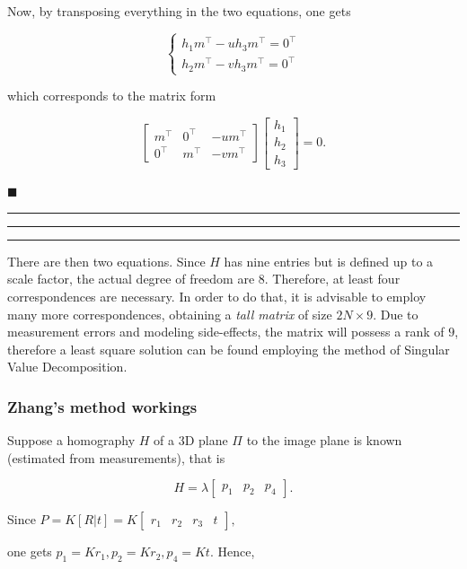 \documentclass[10pt]{report}
\begin{document}
Now, by transposing everything in the two equations, one gets

\[ \left\{\begin{array}{l} h_1 m^\top - uh_3 m^\top = 0^\top\\ h_2 m^\top - vh_3 m^\top = 0^\top \end{array}\right. \]

which corresponds to the matrix form

\[ \begin{bmatrix} m^\top & 0^\top & -um^\top \\ 0^\top & m^\top & -vm^\top \end{bmatrix} \begin{bmatrix} h_1\\ h_2\\ h_3 \end{bmatrix} = 0. \]

\begin{flushright}
$\blacksquare$
\end{flushright}

\vspace*{0.6cm}\hrule
\hrule
\hrule
\vspace*{0.4cm}

There are then two equations. Since \(H\) has nine entries but is defined up to a scale factor, the actual degree of freedom are \(8\). Therefore, at least four correspondences are necessary. In order to do that, it is advisable to employ many more correspondences, obtaining a \emph{tall matrix} of size \(2N \times 9\). Due to measurement errors and modeling side\--effects, the matrix will possess a rank of \(9\), therefore a least square solution can be found employing the method of Singular Value Decomposition.

\subsubsection{Zhang's method workings}
\label{zhangs-method-workings}
Suppose a homography \(H\) of a 3D plane \(\Pi\) to the image plane is
known (estimated from measurements), that is

\[ H = \lambda \begin{bmatrix} p_1 & p_2 & p_4\end{bmatrix}.\]

Since
\(P = K[R|t] = K\begin{bmatrix} r_1 & r_2 & r_3 & t \end{bmatrix},\)

one gets \(p_1 = Kr_1, p_2 = Kr_2, p_4 = Kt\). Hence,
\end{document}
